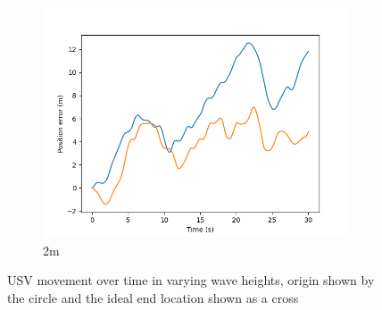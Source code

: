 \documentclass[class=article, crop=false]{standalone}
\begin{document}
\begin{figure}
\begin{subfigure}[b]{0.48\textwidth}
        \includegraphics{scenario1/rov-50m/2.0m/usv_pos_error_controlled}
        \caption{2m}
        \label{}
    \end{subfigure}
    \caption{USV movement over time in varying wave heights, origin shown by the circle and the ideal end location shown as a cross}
    \label{}
\end{figure}
\end{document}
